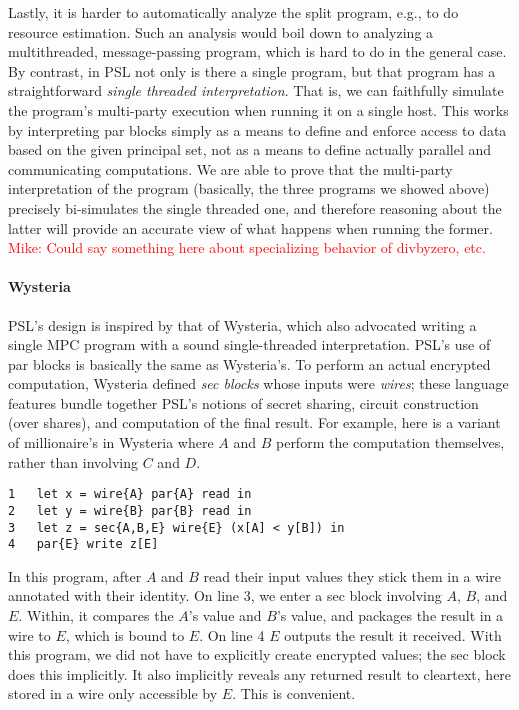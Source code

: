 \documentclass[10pt]{article}
\newcommand{\mwh}[1]{\textcolor{red}{Mike: #1}}
\begin{document}
Lastly, it is harder to automatically analyze the split program, e.g.,
to do resource estimation. Such an analysis would boil down to
analyzing a multithreaded, message-passing program, which is hard to
do in the general case. By contrast, in PSL not only is there a single
program, but that program has a straightforward \emph{single threaded
  interpretation}. That is, we can faithfully simulate the program's
multi-party execution when running it on a single host. This works by
interpreting par blocks simply as a means to define and enforce access
to data based on the given principal set, not as a means to define
actually parallel and communicating computations. We are able to prove
that the multi-party interpretation of the program (basically, the
three programs we showed above) precisely bi-simulates the single
threaded one, and therefore reasoning about the latter will provide an
accurate view of what happens when running the former. \mwh{Could say
  something here about specializing behavior of divbyzero, etc.}

\paragraph{Wysteria}

PSL's design is inspired by that of Wysteria, which also advocated
writing a single MPC program with a sound single-threaded
interpretation. PSL's use of par blocks is basically the same as
Wysteria's. To perform an actual encrypted computation, Wysteria
defined \emph{sec blocks} whose inputs were \emph{wires}; these
language features bundle together PSL's notions of secret sharing,
circuit construction (over shares), and computation of the final
result. For example, here is a variant of millionaire's in Wysteria
where $A$ and $B$ perform the computation themselves, rather than
involving $C$ and $D$.
\begin{verbatim}
1   let x = wire{A} par{A} read in
2   let y = wire{B} par{B} read in
3   let z = sec{A,B,E} wire{E} (x[A] < y[B]) in
4   par{E} write z[E]
\end{verbatim}
In this program, after $A$ and $B$ read their input values they stick
them in a wire annotated with their identity. On line 3, we enter a
sec block involving $A$, $B$, and $E$. Within, it compares the $A$'s
value and $B$'s value, and packages the result in a wire to $E$, which
is bound to $E$. On line 4 $E$ outputs the result it received.  With
this program, we did not have to explicitly create encrypted values;
the sec block does this implicitly. It also implicitly reveals any
returned result to cleartext, here stored in a wire only accessible by
$E$. This is convenient.
\end{document}
